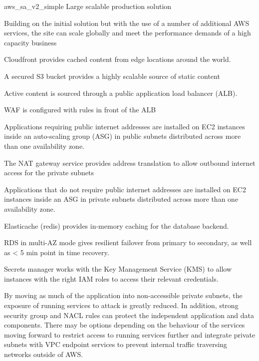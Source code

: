 
\architecture
{aws_sa_v2_simple}
{Large scalable production solution}

\changes
{Building on the initial solution but with the use of a number of additional AWS services, the site can scale globally and meet the performance demands of a high capacity business}
{
\item \label{item:aws_sa_v2_simple_cloudfront} Cloudfront provides cached content from edge locations around the world. 
\item \label{item:aws_sa_v2_simple_s3_origin} A secured S3 bucket provides a highly scalable source of static content
\item \label{item:aws_sa_v2_simple_alb} Active content is sourced through a public application load balancer (ALB).
\item \label{item:aws_sa_v2_simple_waf} WAF is configured with rules in front of the ALB
\item \label{item:aws_sa_v2_simple_azs} Applications requiring public internet addresses are installed on EC2 instances inside an auto-scaling group (ASG) in public subnets distributed across more than one availability zone.
\item \label{item:aws_sa_v2_simple_nat} The NAT gateway service provides address translation to allow outbound internet access for the private subnets
\item \label{item:aws_sa_v2_simple_private} Applications that do not require public internet addresses are installed on EC2 instances inside an ASG in private subnets distributed across more than one availability zone.
\item \label{item:aws_sa_v2_simple_elasticache} Elasticache (redis) provides in-memory caching for the database backend.
\item \label{item:aws_sa_v2_simple_rds} RDS in multi-AZ mode gives resilient failover from primary to secondary, as well as < 5 min point in time recovery.
\item \label{item:aws_sa_v2_simple_secrets} Secrets manager works with the Key Management Service (KMS) to allow instances with the right IAM roles to access their relevant credentials.
}




By moving as much of the application into non-accessible private subnets, the exposure of running services to attack is greatly reduced. In addition, strong security group and NACL rules can protect the independent application and data components. There may be options depending on the behaviour of the services moving forward to restrict access to running services further and integrate private subnets with VPC endpoint services to prevent internal traffic traversing networks outside of AWS.

